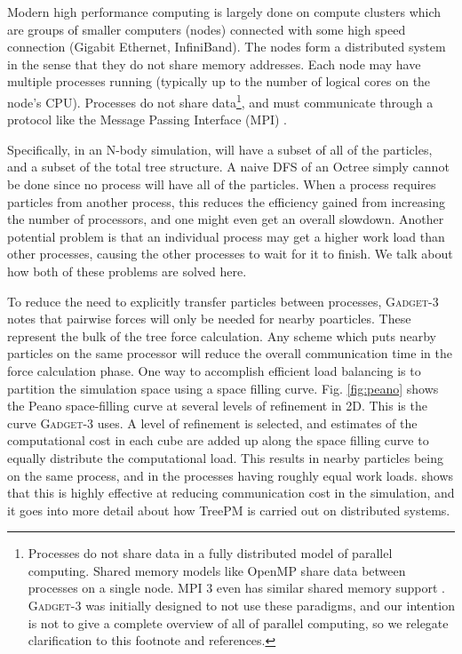 Modern high performance computing is largely done on compute clusters which are groups of smaller computers (nodes) connected with some high speed connection (Gigabit Ethernet, InfiniBand). The nodes form a distributed system in the sense that they do not share memory addresses. Each node may have multiple processes running (typically up to the number of logical cores on the node's CPU). Processes do not share data\footnote{Processes do not share data in a fully distributed model of parallel computing. Shared memory models like OpenMP \citep{openmp} share data between processes on a single node. MPI 3 even has similar shared memory support \citep{mpi3_shared}. \textsc{Gadget-3} was initially designed to not use these paradigms, and our intention is not to give a complete overview of all of parallel computing, so we relegate clarification to this footnote and references.}, and must communicate through a protocol like the Message Passing Interface (MPI) \citep{mpi_standard}.

Specifically, in an N-body simulation,  will have a subset of all of the particles, and a subset of the total tree structure. A naive DFS of an Octree simply cannot be done since no process will have all of the particles. When a process requires particles from another process, this reduces the efficiency gained from increasing the number of processors, and one might even get an overall slowdown. Another potential problem is that an individual process may get a higher work load than other processes, causing the other processes to wait for it to finish. We talk about how both of these problems are solved here.

To reduce the need to explicitly transfer particles between processes, \textsc{Gadget-3} notes that pairwise forces will only be needed for nearby poarticles. These represent the bulk of the tree force calculation. Any scheme which puts nearby particles on the same processor will reduce the overall communication time in the force calculation phase. One way to accomplish efficient load balancing is to partition the simulation space using a space filling curve. Fig. \ref{fig:peano} shows the Peano space-filling curve at several levels of refinement in 2D. This is the curve \textsc{Gadget-3} uses. A level of refinement is selected, and estimates of the computational cost in each cube are added up along the space filling curve to equally distribute the computational load. This results in nearby particles being on the same process, and in the processes having roughly equal work loads. \citet{GadgetCodePaper} shows that this is highly effective at reducing communication cost in the simulation, and it goes into more detail about how TreePM is carried out on distributed systems.


